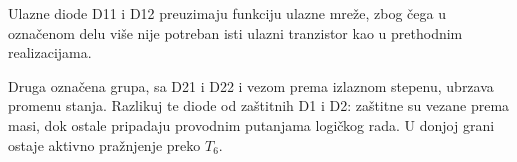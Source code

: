 Ulazne diode D11 i D12 preuzimaju funkciju ulazne mreže, zbog čega u označenom delu više nije potreban isti ulazni tranzistor kao u prethodnim realizacijama.

Druga označena grupa, sa D21 i D22 i vezom prema izlaznom stepenu, ubrzava promenu stanja. Razlikuj te diode od zaštitnih D1 i D2: zaštitne su vezane prema masi, dok ostale pripadaju provodnim putanjama logičkog rada. U donjoj grani ostaje aktivno pražnjenje preko $T_6$.
